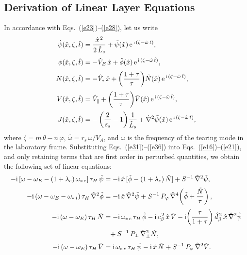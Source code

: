 \documentclass[12pt,prb,aps]{revtex4-1}
\begin{document}
\subsection{Derivation of Linear Layer Equations}
In accordance with Eqs.~(\ref{e23})--(\ref{e28}), let us write
\begin{align}\label{e31}
\hat{\psi}(\hat{x},\zeta,\hat{t}) &= \frac{\hat{x}^{\,2} }{2\,\hat{L}_s}+ \tilde{\psi}(\hat{x})\,{\rm e}^{\,{\rm i}\,(\zeta-\hat{\omega}\,\hat{t})},\\[0.5ex]
\phi(\hat{x},\zeta,\hat{t}) &=-\hat{V}_E\,\hat{x}+ \tilde{\phi}(\hat{x})\,{\rm e}^{\,{\rm i}\,(\zeta-\hat{\omega}\,\hat{t})},\\[0.5ex]
N(\hat{x},\zeta,\hat{t}) &= -\hat{V}_\ast\,\hat{x}+\left(\frac{1+\tau}{\tau}\right)\!\tilde{N}(\hat{x})\,{\rm e}^{\,{\rm i}\,(\zeta-\hat{\omega}\,\hat{t})},\\[0.5ex]
V(\hat{x},\zeta,\hat{t}) &= \hat{V}_\parallel + \left(\frac{1+\tau}{\tau}\right)\!\tilde{V}(\hat{x})\,{\rm e}^{\,{\rm i}\,(\zeta-\hat{\omega}\,\hat{t})},\\[0.5ex]
J(\hat{x},\zeta,\hat{t}) &=-\left(\frac{2}{s_s}-1\right)\!\frac{1}{\hat{L}_s}+ \hat{\nabla}^2\tilde{\psi}(\hat{x})\,{\rm e}^{\,{\rm i}\,(\zeta-\hat{\omega}\,\hat{t})},\label{e36}
\end{align}
where $\zeta=m\,\theta-n\,\varphi$, $\hat{\omega}=r_s\,\omega/V_A$, and $\omega$ is the frequency of the tearing mode in the laboratory frame. 
Substituting Eqs.~(\ref{e31})--(\ref{e36}) into Eqs.~(\ref{e16})--(\ref{e21}), 
 and only retaining terms that
are first order in perturbed quantities, we obtain the following set of linear equations:
\begin{align}\label{e37}
-{\rm i}\,[\omega-\omega_E -(1+\lambda_e)\,\omega_{\ast\,e}]\,\tau_H\,\tilde{\psi} &= -{\rm i} \,\hat{x}\,[\tilde{\phi}-(1+\lambda_e)\,\tilde{N}] + S^{-1}\,\hat{\nabla}^2\tilde{\psi},\\[0.5ex]
-{\rm i}\,(\omega-\omega_E-\omega_{\ast\,i})\,\tau_H\,\hat{\nabla}^2\tilde{\phi} &= -{\rm i}\,\hat{x}\,\hat{\nabla}^2\tilde{\psi}+S^{-1}\,P_\varphi\,\hat{\nabla}^4\!\left(\tilde{\phi} + \frac{\tilde{N}}{\tau}\right),\\[0.5ex]
-{\rm i}\,(\omega-\omega_E)\,\tau_H\,\tilde{N} &= -{\rm i}\,\omega_{\ast\,e}\,\tau_H\,\tilde{\phi}-{\rm i}\,c_\beta^{\,2}\,\hat{x}\,\tilde{V} - {\rm i}\!\left(\frac{\tau}{1+\tau}\right)\hat{d}_\beta^{\,2}\,\hat{x}\,\hat{\nabla}^2\tilde{\psi}\nonumber\\[0.5ex]
&\phantom{=} + S^{-1}\,P_\perp\,\hat{\nabla}_\perp^2 \tilde{N},\\[0.5ex]
-{\rm i}\,(\omega-\omega_E)\,\tau_H\,\tilde{V} &= {\rm i}\,\omega_{\ast\,e}\,\tau_H\,\tilde{\psi} - {\rm i}\,\hat{x}\,\tilde{N}
+ S^{-1}\,P_\varphi\,\hat{\nabla}^2\tilde{V}.\label{e40}
\end{align}
\end{document}
